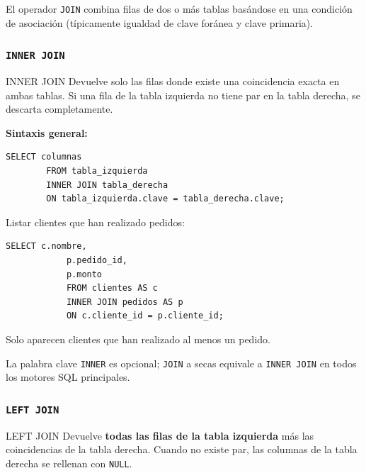 \documentclass[12pt, a4paper]{article}
\begin{document}
	El operador \texttt{JOIN} combina filas de dos o más tablas basándose
	en una condición de asociación (típicamente igualdad de clave foránea
	y clave primaria).
	
	\subsubsection{\texttt{INNER JOIN}}
	
	\begin{definicion}{INNER JOIN}
		Devuelve solo las filas donde existe una coincidencia exacta en ambas
		tablas. Si una fila de la tabla izquierda no tiene par en la tabla
		derecha, se descarta completamente.
	\end{definicion}
	
	\textbf{Sintaxis general:}
	
	\begin{lstlisting}[style=sql, caption={Sintaxis de INNER JOIN}]
		SELECT columnas
		FROM tabla_izquierda
		INNER JOIN tabla_derecha
		ON tabla_izquierda.clave = tabla_derecha.clave;
	\end{lstlisting}
	
	\begin{ejemplo}
		Listar clientes que han realizado pedidos:
		
		\begin{lstlisting}[style=sql, caption={INNER JOIN: clientes con pedidos}]
			SELECT c.nombre,
			p.pedido_id,
			p.monto
			FROM clientes AS c
			INNER JOIN pedidos AS p
			ON c.cliente_id = p.cliente_id;
		\end{lstlisting}
		
		Solo aparecen clientes que han realizado al menos un pedido.
	\end{ejemplo}
	
	\begin{nota}
		La palabra clave \texttt{INNER} es opcional; \texttt{JOIN} a secas equivale a
		\texttt{INNER JOIN} en todos los motores SQL principales.
	\end{nota}
	
	\subsubsection{\texttt{LEFT JOIN}}
	
	\begin{definicion}{LEFT JOIN}
		Devuelve \textbf{todas las filas de la tabla izquierda} más las coincidencias de la tabla
		derecha. Cuando no existe par, las columnas de la tabla derecha se rellenan con
		\texttt{NULL}.
	\end{definicion}
	
\end{document}
